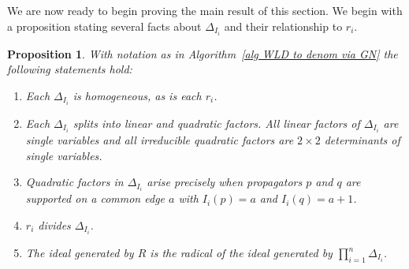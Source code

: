 \documentclass[11pt]{article}
\newtheorem{prop}[thm]{Proposition}
\theoremstyle{remark}
\theoremstyle{definition}
\begin{document}
We are now ready to begin proving the main result of this section. We begin with a proposition stating several facts about $\Delta_{I_i}$ and their relationship to $r_i$.

\begin{prop}\label{prop alg gives rad}
  With notation as in Algorithm~\ref{alg WLD to denom via GN} the following statements hold:
  \begin{enumerate}
    \item Each $\Delta_{I_i}$ is homogeneous, as is each $r_i$.
    \item Each $\Delta_{I_i}$ splits into linear and quadratic factors.  All linear factors of  $\Delta_{I_i}$ are single variables and all irreducible quadratic factors are $2\times 2$ determinants of single variables.
    \item Quadratic factors in $\Delta_{I_i}$ arise precisely when propagators $p$ and $q$ are supported on a common edge $a$ with $I_i(p)=a$ and $I_i(q)=a+1$.
    \item $r_i$ divides $\Delta_{I_i}$.
    \item The ideal generated by $R$ is the radical of the ideal generated by $\prod_{i=1}^{n}\Delta_{I_i}$.
  \end{enumerate}
\end{prop}
\end{document}
